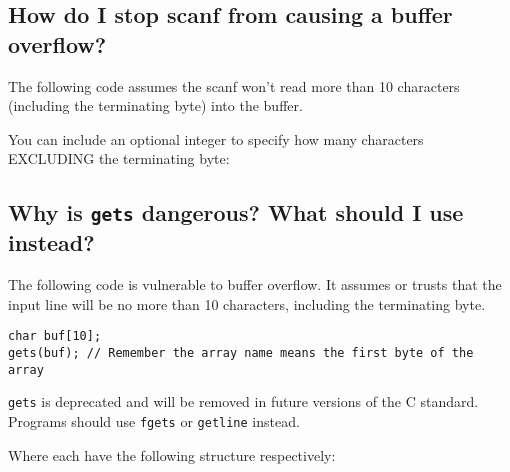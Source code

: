 \subsection{How do I stop scanf from causing a buffer
overflow?}\label{how-do-i-stop-scanf-from-causing-a-buffer-overflow}

The following code assumes the scanf won't read more than 10 characters
(including the terminating byte) into the buffer.

\begin{Shaded}
\end{Shaded}

You can include an optional integer to specify how many characters
EXCLUDING the terminating byte:

\begin{Shaded}
\end{Shaded}

\subsection{\texorpdfstring{Why is \texttt{gets} dangerous? What should
I use
instead?}{Why is gets dangerous? What should I use instead?}}\label{why-is-gets-dangerous-what-should-i-use-instead}

The following code is vulnerable to buffer overflow. It assumes or
trusts that the input line will be no more than 10 characters, including
the terminating byte.

\begin{verbatim}
char buf[10];
gets(buf); // Remember the array name means the first byte of the array
\end{verbatim}

\texttt{gets} is deprecated and will be removed in future versions of
the C standard. Programs should use \texttt{fgets} or \texttt{getline}
instead.

Where each have the following structure respectively:

